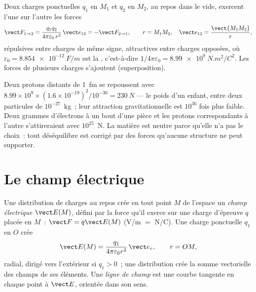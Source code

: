 \begin{theorem}\label{thm:b1:electrostatics-gauss:coulomb}
Deux charges ponctuelles $q_1$ en $M_1$ et $q_2$ en $M_2$, au repos dans le
vide, exercent l'une sur l'autre les forces
\[
\vect F_{1 \to 2} = \frac{q_1q_2}{4\pi\varepsilon_0\,r^2}\,\vect e_{12} = -\vect F_{2 \to 1},
\qquad r = M_1M_2,\quad \vect e_{12} = \frac{\vect{M_1M_2}}{r},
\]
répulsives entre charges de même signe, attractives entre charges opposées, où
$\varepsilon_0 = \qty{8.854e-12}{F/m}$ est la \emph{}, c'est-à-dire
$1/4\pi\varepsilon_0 = \qty{8.99e9}{N.m^2/C^2}$. Les forces de plusieurs charges
s'ajoutent (superposition).
\end{theorem}
\admitted

\begin{example}\label{ex:b1:electrostatics-gauss:strong}
Deux protons distants de \qty{1}{fm} se repoussent avec $8.99 \times 10^9 \times (1.6 \times
10^{-19})^2/10^{-30} = \qty{230}{N}$ --- le poids d'un enfant, entre deux
particules de $10^{-27}$~kg~; leur attraction gravitationnelle est
$10^{36}$ fois plus faible. Deux grammes d'électrons à un bout d'une pièce et
les protons correspondants à l'autre s'attireraient avec $10^{25}$~N. La
matière est neutre parce qu'elle n'a pas le choix~: tout déséquilibre est
corrigé par des forces qu'aucune structure ne peut supporter.
\end{example}

\section{Le champ électrique}

\begin{definition}\label{def:b1:electrostatics-gauss:field}
Une distribution de charges au repos crée en tout point $M$ de l'espace un
\emph{champ électrique} $\vect E(M)$, défini par la force qu'il exerce sur une
charge d'épreuve $q$ placée en $M$~: $\vect F = q\vect E(M)$ (\unit{V/m} $=$
\unit{N/C}). Une charge ponctuelle $q_1$ en $O$ crée
\[
\vect E(M) = \frac{q_1}{4\pi\varepsilon_0 r^2}\,\vect e_r , \qquad r = OM ,
\]
radial, dirigé vers l'extérieur si $q_1 > 0$~; une distribution crée la somme
vectorielle des champs de ses éléments. Une \emph{ligne de champ} est une
courbe tangente en chaque point à $\vect E$, orientée dans son sens.
\end{definition}

